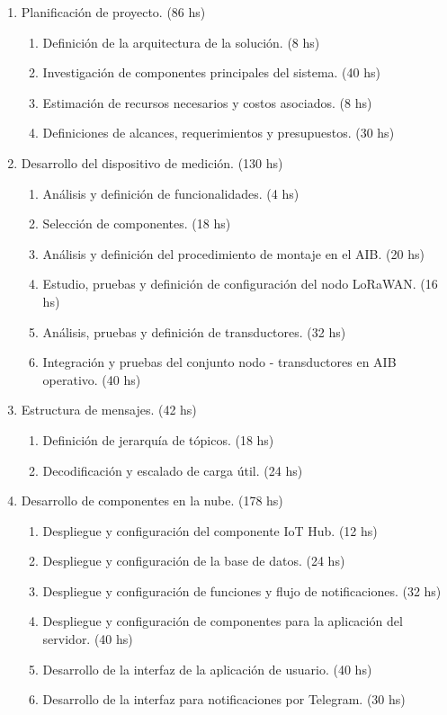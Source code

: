\documentclass[
11pt, %
]{charter}
\begin{document}
\begin{enumerate}
\item Planificación de proyecto. (86 hs)
	\begin{enumerate}
	\item Definición de la arquitectura de la solución. (8 hs)
	\item Investigación de componentes principales del sistema. (40 hs)
	\item Estimación de recursos necesarios y costos asociados. (8 hs)
	\item Definiciones de alcances, requerimientos y presupuestos. (30 hs)
	\end{enumerate}
\item Desarrollo del dispositivo de medición. (130 hs)
	\begin{enumerate}
	\item Análisis y definición de funcionalidades. (4 hs)
	\item Selección de componentes. (18 hs)
	\item Análisis y definición del procedimiento de montaje en el AIB. (20 hs)
	\item Estudio, pruebas y definición de configuración del nodo LoRaWAN. (16 hs)
	\item Análisis, pruebas y definición de transductores. (32 hs)
	\item Integración y pruebas del conjunto nodo - transductores en AIB operativo. (40 hs)
	\end{enumerate}
\item Estructura de mensajes. (42 hs)
	\begin{enumerate}
	\item Definición de jerarquía de tópicos. (18 hs)
	\item Decodificación y escalado de carga útil. (24 hs)
	\end{enumerate}
	
\item Desarrollo de componentes en la nube. (178 hs)
	\begin{enumerate}
	\item Despliegue y configuración del componente IoT Hub. (12 hs)
	\item Despliegue y configuración de la base de datos. (24 hs)
	\item Despliegue y configuración de funciones y flujo de notificaciones. (32 hs)
	\item Despliegue y configuración de componentes para la aplicación del servidor. (40 hs)
	\item Desarrollo de la interfaz de la aplicación de usuario. (40 hs)
	\item Desarrollo de la interfaz para notificaciones por Telegram. (30 hs)
	\end{enumerate}


\end{enumerate}
\end{document}
